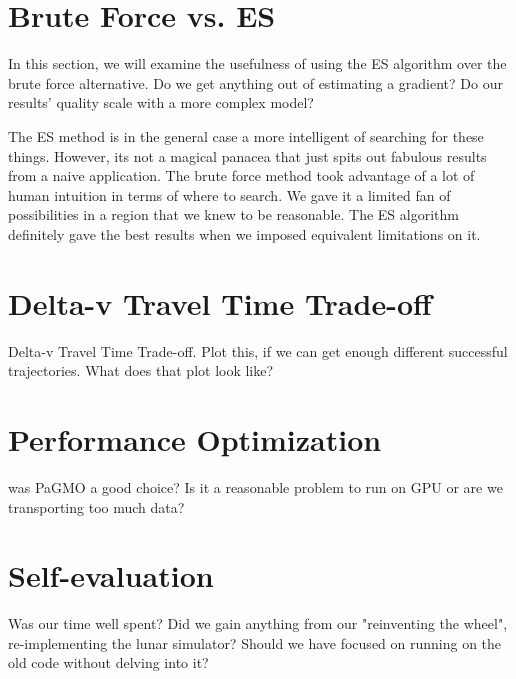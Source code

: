 \section{Brute Force vs. ES}
In this section, we will examine the usefulness of using the ES algorithm over the brute force alternative. Do we get anything out of estimating a gradient? Do our results’ quality scale with a more complex model?

The ES method is in the general case a more intelligent of searching for these things. However, its not a magical panacea that just spits out fabulous results from a naive application. The brute force method took advantage of a lot of human intuition in terms of where to search. We gave it a limited fan of possibilities in a region that we knew to be reasonable. The ES algorithm definitely gave the best results when we imposed equivalent limitations on it.

\section{Delta-v Travel Time Trade-off}
Delta-v Travel Time Trade-off. Plot this, if we can get enough different successful trajectories. What does that plot look like?

\section{Performance Optimization}
was PaGMO a good choice? Is it a reasonable problem to run on GPU or are we transporting too much data?

\section{Self-evaluation}
Was our time well spent? Did we gain anything from our "reinventing the wheel", re-implementing the lunar simulator? Should we have focused on running on the old code without delving into it?